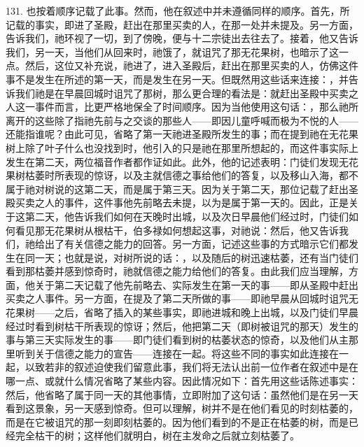 131. 也按着顺序记载了此事。\newline{}然而，他在叙述中并未遵循同样的顺序。首先，所记载的事实，即进了圣殿，赶出在那里买卖的人，在那一处并未提及。另一方面，告诉我们，祂环视了一切，到了傍晚，便与十二宗徒出去往去了。接着，他又告诉我们，另一天，当他们从回来时，祂饿了，就诅咒了那无花果树，也暗示了这一点。然后，这位又补充说，祂进了，进入圣殿后，赶出在那里买卖的人，仿佛这件事不是发生在所述的第一天，而是发生在另一天。但既然用这些话来连接：，并告诉我们祂是在早晨回城时诅咒了那树，那么更合理的看法是：就赶出圣殿中买卖之人这一事件而言，比更严格地保全了时间顺序。因为当他使用这句话：，那么祂所离开的这些除了指祂先前与之交谈的那些人——即因儿童呼喊而极为不悦的人——还能指谁呢？由此可见，省略了第一天祂进圣殿所发生的事；而在提到祂在无花果树上除了叶子什么也没找到时，他引入的只是祂在那里所想起的，而这件事实际上发生在第二天，两位福音作者都作证如此。此外，他的记述表明：门徒们发现无花果树枯萎时所表现的惊讶，以及主就信德之事给他们的答复，以及移山入海，都不属于祂对树说的这第二天，而是属于第三天。因为关于第二天，那位记载了赶出圣殿买卖之人的事件，这件事他先前略去未提，以为是属于第一天的。因此，正是关于这第二天，他告诉我们如何在天晚时出城，以及次日早晨他们经过时，门徒们如何看见那无花果树从根枯干，伯多禄如何想起这事，对祂说：然后，他又告诉我们，祂给出了有关信德之能力的回答。另一方面，记述这些事的方式暗示它们都发生在同一天；也就是说，对树所说的话：，以及随后的树迅速枯萎，还有当门徒们看到那枯萎并感到惊奇时，祂就信德之能力给他们的答复。由此我们应当理解，方面，他关于第二天记载了他先前略去、实际发生在第一天的事——即从圣殿中赶出买卖之人事件。另一方面，在提及了第二天所做的事——即祂早晨从回城时诅咒无花果树——之后，省略了插入的某些事实，即祂进城和晚上出城，以及门徒们早晨经过时看到树枯干所表现的惊讶；然后，他把第二天（即树被诅咒的那天）发生的事与第三天实际发生的事——即门徒们看到树的枯萎状态的惊奇，以及他们从主那里听到关于信德之能力的宣告——连接在一起。将这些不同的事实如此连接在一起，以致若非的叙述迫使我们留意此事，我们将无法认出前一位作者在叙述中是在哪一点、或就什么情况省略了某些内容。因此情况如下：首先用这些话陈述事实：然后，他省略了属于同一天的其他事情，立即附加了这句话：虽然他们是在另一天看到这景象，另一天感到惊奇。但可以理解，树并不是在他们看见的时刻枯萎的，而是在它被诅咒的那一刻即刻枯萎的。因为他们看到的不是正在枯萎的树，而是已经完全枯干的树；这样他们就明白，树在主发命之后就立刻枯萎了。\par

